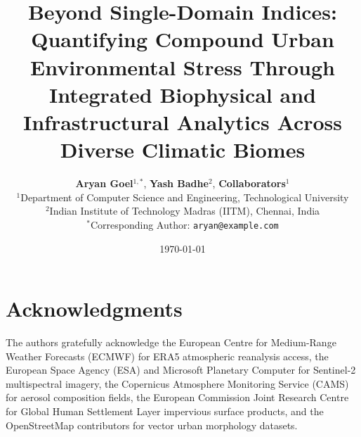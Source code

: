\documentclass[11pt,a4paper]{article}
\title{\textbf{\Large Beyond Single-Domain Indices: Quantifying Compound Urban Environmental Stress Through Integrated Biophysical and Infrastructural Analytics Across Diverse Climatic Biomes}}
\author{
    \textbf{Aryan Goel}$^{1,*}$, 
    \textbf{Yash Badhe}$^{2}$, 
    \textbf{Collaborators}$^{1}$ \\[0.5em]
    \small $^{1}$Department of Computer Science and Engineering, Technological University \\
    \small $^{2}$Indian Institute of Technology Madras (IITM), Chennai, India \\
    \small $^*$Corresponding Author: \texttt{aryan@example.com}
}
\date{\today}
\begin{document}
\maketitle



\newpage



















\section*{Acknowledgments}
The authors gratefully acknowledge the European Centre for Medium-Range Weather Forecasts (ECMWF) for ERA5 atmospheric reanalysis access, the European Space Agency (ESA) and Microsoft Planetary Computer for Sentinel-2 multispectral imagery, the Copernicus Atmosphere Monitoring Service (CAMS) for aerosol composition fields, the European Commission Joint Research Centre for Global Human Settlement Layer impervious surface products, and the OpenStreetMap contributors for vector urban morphology datasets.



\end{document}
